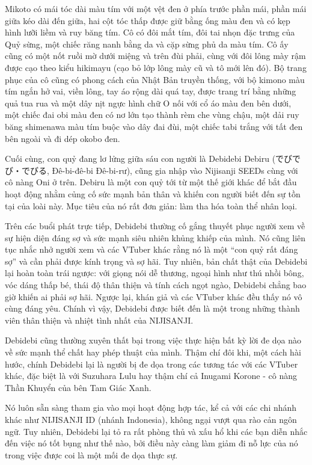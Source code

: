 \documentclass[../main.tex]{subfiles}
\begin{document}
Mikoto có mái tóc dài màu tím với một vệt đen ở phía trước phần mái, phần mái giữa kéo dài đến giữa, hai cột tóc thấp được giữ bằng ống màu đen và có kẹp hình lưỡi liềm và ruy băng tím. Cô có đôi mắt tím, đôi tai nhọn đặc trưng của Quỷ sừng, một chiếc răng nanh bằng da và cặp sừng phủ da màu tím. Cô ấy cũng có một nốt ruồi mờ dưới miệng và trên đùi phải, cùng với đôi lông mày rậm được cạo theo kiểu hikimayu (cạo bỏ lớp lông mày cũ và tô mới lên đó). Bộ trang phục của cô cũng có phong cách của Nhật Bản truyền thống, với bộ kimono màu tím ngắn hở vai, viền lông, tay áo rộng dài quá tay, được trang trí bằng những quả tua rua và một dây nịt ngực hình chữ O nối với cổ áo màu đen bên dưới, một chiếc đai obi màu đen có nơ lớn tạo thành rèm che vùng chậu, một dải ruy băng shimenawa màu tím buộc vào dây đai đùi, một chiếc tabi trắng với tất đen bên ngoài và đi dép okobo đen.


Cuối cùng, con quỷ đang lơ lửng giữa sáu con người là Debidebi Debiru (でびでび・でびる, Đê-bi-đê-bi Đê-bi-rư), cũng gia nhập vào Nijisanji SEEDs cùng với cô nàng Oni ở trên. Debiru là một con quỷ tới từ một thế giới khác để bắt đầu hoạt động nhằm củng cố sức mạnh bản thân và khiến con người biết đến sự tồn tại của loài này. Mục tiêu của nó rất đơn giản: làm tha hóa toàn thể nhân loại.

Trên các buổi phát trực tiếp, Debidebi thường cố gắng thuyết phục người xem về sự hiện diện đáng sợ và sức mạnh siêu nhiên khủng khiếp của mình. Nó cũng liên tục nhắc nhở người xem và các VTuber khác rằng nó là một  ``con quỷ rất đáng sợ'' và cần phải được kính trọng và sợ hãi. Tuy nhiên, bản chất thật của Debidebi lại hoàn toàn trái ngược: với giọng nói dễ thương, ngoại hình như thú nhồi bông, vóc dáng thấp bé, thái độ thân thiện và tính cách ngọt ngào, Debidebi chẳng bao giờ khiến ai phải sợ hãi. Ngược lại, khán giả và các VTuber khác đều thấy nó vô cùng đáng yêu. Chính vì vậy, Debidebi được biết đến là một trong những thành viên thân thiện và nhiệt tình nhất của NIJISANJI.

Debidebi cũng thường xuyên thất bại trong việc thực hiện bất kỳ lời đe dọa nào về sức mạnh thể chất hay phép thuật của mình. Thậm chí đôi khi, một cách hài hước, chính Debidebi lại là người bị đe dọa trong các tương tác với các VTuber khác, đặc biệt là với Suzuhara Lulu hay thậm chí cả Inugami Korone - cô nàng Thần Khuyển của bên Tam Giác Xanh.

Nó luôn sẵn sàng tham gia vào mọi hoạt động hợp tác, kể cả với các chi nhánh khác như NIJISANJI ID (nhánh Indonesia), không ngại vượt qua rào cản ngôn ngữ. Tuy nhiên, Debidebi lại tỏ ra rất phòng thủ và xấu hổ khi các bạn diễn nhắc đến việc nó tốt bụng như thế nào, bởi điều này càng làm giảm đi nỗ lực của nó trong việc được coi là một mối đe dọa thực sự.
\end{document}
